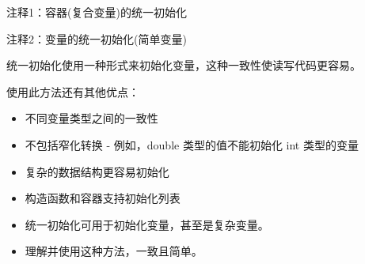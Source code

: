 {\footnotesize
注释1：容器(复合变量)的统一初始化

注释2：变量的统一初始化(简单变量)
}

统一初始化使用一种形式来初始化变量，这种一致性使读写代码更容易。

使用此方法还有其他优点：

\begin{itemize}
\item
不同变量类型之间的一致性

\item
不包括窄化转换 - 例如，double 类型的值不能初始化 int 类型的变量

\item
复杂的数据结构更容易初始化

\item
构造函数和容器支持初始化列表
\end{itemize}


\begin{itemize}
\item
统一初始化可用于初始化变量，甚至是复杂变量。

\item
理解并使用这种方法，一致且简单。
\end{itemize}
